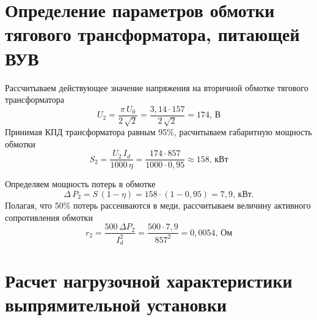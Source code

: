 \section{Определение параметров обмотки тягового трансформатора, питающей ВУВ}

Рассчитываем действующее значение напряжения на вторичной обмотке тягового трансформатора
\begin{equation*}
 U_2 = \frac{\pi \, U_0}{2\,\sqrt{2}} = \frac{3,14 \cdot 157}{2\,\sqrt{2}} = 174, \, \text{В} 
\end{equation*}
Принимая КПД трансформатора равным 95\%, расчитываем габаритную мощность обмотки
\begin{equation*}
 S_2 = \frac{U_2 \, I_d}{1000 \, \eta}  = \frac{174 \cdot 857}{1000 \cdot 0,95} \approx 158, \, \text{кВт}
\end{equation*}

Определяем мощность потерь в обмотке
\begin{equation*}
 \Delta \, P_2 = S \, (1 - \eta) = 158 \cdot (1 - 0,95) = 7,9, \, \text{кВт}.
\end{equation*}
Полагая, что 50\% потерь рассеиваются в меди, рассчитываем величину активного сопротивления обмотки
\begin{equation*}
 r_2 = \frac{500 \, \Delta P_2}{I_d^2} = \frac{500 \cdot 7,9}{857^2} = 0,0054, \, \text{Ом}
\end{equation*}

\section{Расчет нагрузочной характеристики выпрямительной установки}

